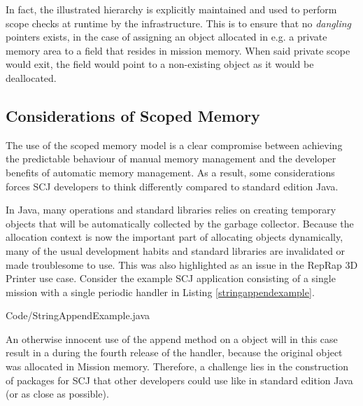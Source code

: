 
In fact, the illustrated hierarchy is explicitly maintained and used to perform scope checks at runtime by the infrastructure. This is to ensure that no \textit{dangling} pointers exists, in the case of assigning an object allocated in e.g. a private memory area to a field that resides in mission memory\cite{Schoeberl:2011:MMS:2043910.2043919}. When said private scope would exit, the field would point to a non-existing object as it would be deallocated.


\subsection{Considerations of Scoped Memory} %
\label{sub:considerations_of_scoped_memory}
The use of the scoped memory model is a clear compromise between achieving the predictable behaviour of manual memory management and the developer benefits of automatic memory management. As a result, some considerations forces SCJ developers to think differently compared to standard edition Java.

In Java, many operations and standard libraries relies on creating temporary objects that will be automatically collected by the garbage collector. Because the allocation context is now the important part of allocating objects dynamically, many of the usual development habits and standard libraries are invalidated or made troublesome to use. This was also highlighted as an issue in the RepRap 3D Printer use case\cite{Schoeberl:2012:RepRap}. Consider the example SCJ application consisting of a single mission with a single periodic handler in Listing \ref{stringappendexample}. 


{Code/StringAppendExample.java}

An otherwise innocent use of the append method on a  object will in this case result in a  during the fourth release of the handler, because the original  object was allocated in Mission memory. Therefore, a challenge lies in the construction of packages for SCJ that other developers could use like in standard edition Java (or as close as possible).

